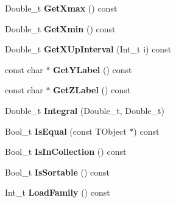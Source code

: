 \begin{DoxyCompactItemize}
\item 
\hypertarget{classTSplineFit_a04cf2186172686958007569cab5e804b}{Double\-\_\-t {\bfseries Get\-Xmax} () const }\label{classTSplineFit_a04cf2186172686958007569cab5e804b}

\item 
\hypertarget{classTSplineFit_aeb1bb3490e4dbd4423972eb8bbd3398b}{Double\-\_\-t {\bfseries Get\-Xmin} () const }\label{classTSplineFit_aeb1bb3490e4dbd4423972eb8bbd3398b}

\item 
\hypertarget{classTSplineFit_a6757a51c9125702c97c0d66635b4ffaa}{Double\-\_\-t {\bfseries Get\-X\-Up\-Interval} (Int\-\_\-t i) const }\label{classTSplineFit_a6757a51c9125702c97c0d66635b4ffaa}

\item 
\hypertarget{classTSplineFit_a5d632cff2a2ec8d3182486e007b19e14}{const char $\ast$ {\bfseries Get\-Y\-Label} () const }\label{classTSplineFit_a5d632cff2a2ec8d3182486e007b19e14}

\item 
\hypertarget{classTSplineFit_a6965aa3dcee389700e39cf283b85fc1f}{const char $\ast$ {\bfseries Get\-Z\-Label} () const }\label{classTSplineFit_a6965aa3dcee389700e39cf283b85fc1f}

\item 
\hypertarget{classTSplineFit_ab79a394dbfa3cf165253630b0970b788}{Double\-\_\-t {\bfseries Integral} (Double\-\_\-t, Double\-\_\-t)}\label{classTSplineFit_ab79a394dbfa3cf165253630b0970b788}

\item 
\hypertarget{classTSplineFit_ae681977fc645baf6704b52baa9fc52e0}{Bool\-\_\-t {\bfseries Is\-Equal} (const T\-Object $\ast$) const }\label{classTSplineFit_ae681977fc645baf6704b52baa9fc52e0}

\item 
\hypertarget{classTSplineFit_aefff9be4f38c5f4acefbc2205b6a18b8}{Bool\-\_\-t {\bfseries Is\-In\-Collection} () const }\label{classTSplineFit_aefff9be4f38c5f4acefbc2205b6a18b8}

\item 
\hypertarget{classTSplineFit_a44fa87e2412bc96ac47fe27518c7165e}{Bool\-\_\-t {\bfseries Is\-Sortable} () const }\label{classTSplineFit_a44fa87e2412bc96ac47fe27518c7165e}

\item 
\hypertarget{classTSplineFit_a6705c3d1523e5176a9e4604a587faba9}{Int\-\_\-t {\bfseries Load\-Family} () const }\label{classTSplineFit_a6705c3d1523e5176a9e4604a587faba9}


\end{DoxyCompactItemize}
